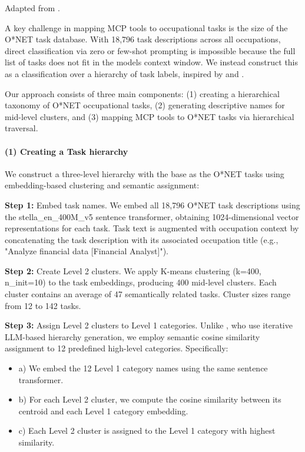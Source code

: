 \documentclass[manuscript,screen,nonacm,oneside]{acmart}
\begin{document}
Adapted from \citet[supplementary materials]{handa2025which}.

A key challenge in mapping MCP tools to occupational tasks is the size of the O*NET task database. With 18,796 task descriptions across all occupations, direct classification via zero or few-shot prompting is impossible because the full list of tasks does not fit in the model\textquotesingle s context window. We instead construct this as a classification over a hierarchy of task labels, inspired by \citet{morin2005hierarchical} and \citet{mnih2008scalable}.

Our approach consists of three main components: (1) creating a hierarchical taxonomy of O*NET occupational tasks, (2) generating descriptive names for mid-level clusters, and (3) mapping MCP tools to O*NET tasks via hierarchical traversal.

\paragraph{(1) Creating a Task hierarchy}\label{creating-a-task-hierarchy}

We construct a three-level hierarchy with the base as the O*NET tasks using embedding-based clustering and semantic assignment:

\textbf{Step 1:} Embed task names. We embed all 18,796 O*NET task descriptions using the stella\_en\_400M\_v5 sentence transformer, obtaining 1024-dimensional vector representations for each task. Task text is augmented with occupation context by concatenating the task description with its associated occupation title (e.g., "Analyze financial data {[}Financial Analyst{]}").

\textbf{Step 2:} Create Level 2 clusters. We apply K-means clustering (k=400, n\_init=10) to the task embeddings, producing 400 mid-level clusters. Each cluster contains an average of 47 semantically related tasks. Cluster sizes range from 12 to 142 tasks.

\textbf{Step 3:} Assign Level 2 clusters to Level 1 categories. Unlike \citet{handa2025which}, who use iterative LLM-based hierarchy generation, we employ semantic cosine similarity assignment to 12 predefined high-level categories. Specifically:

\begin{itemize}
\item
 a) We embed the 12 Level 1 category names using the same sentence transformer.
\item
 b) For each Level 2 cluster, we compute the cosine similarity between its centroid and each Level 1 category embedding.
\item
 c) Each Level 2 cluster is assigned to the Level 1 category with highest similarity.
\end{itemize}
\end{document}
